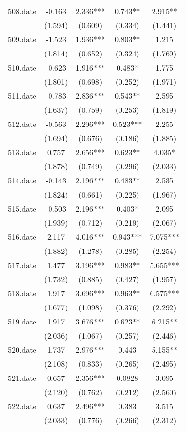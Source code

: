 \documentclass[]{article}
\begin{document}
\begin{tabular}{lcccc}
508.date & -0.163 & 2.336*** & 0.743** & 2.915** \\
 & (1.594) & (0.609) & (0.334) & (1.441) \\
509.date & -1.523 & 1.936*** & 0.803** & 1.215 \\
 & (1.814) & (0.652) & (0.324) & (1.769) \\
510.date & -0.623 & 1.916*** & 0.483* & 1.775 \\
 & (1.801) & (0.698) & (0.252) & (1.971) \\
511.date & -0.783 & 2.836*** & 0.543** & 2.595 \\
 & (1.637) & (0.759) & (0.253) & (1.819) \\
512.date & -0.563 & 2.296*** & 0.523*** & 2.255 \\
 & (1.694) & (0.676) & (0.186) & (1.885) \\
513.date & 0.757 & 2.656*** & 0.623** & 4.035* \\
 & (1.878) & (0.749) & (0.296) & (2.033) \\
514.date & -0.143 & 2.196*** & 0.483** & 2.535 \\
 & (1.824) & (0.661) & (0.225) & (1.967) \\
515.date & -0.503 & 2.196*** & 0.403* & 2.095 \\
 & (1.939) & (0.712) & (0.219) & (2.067) \\
516.date & 2.117 & 4.016*** & 0.943*** & 7.075*** \\
 & (1.882) & (1.278) & (0.285) & (2.254) \\
517.date & 1.477 & 3.196*** & 0.983** & 5.655*** \\
 & (1.732) & (0.885) & (0.427) & (1.957) \\
518.date & 1.917 & 3.696*** & 0.963** & 6.575*** \\
 & (1.677) & (1.098) & (0.376) & (2.292) \\
519.date & 1.917 & 3.676*** & 0.623** & 6.215** \\
 & (2.036) & (1.067) & (0.257) & (2.446) \\
520.date & 1.737 & 2.976*** & 0.443 & 5.155** \\
 & (2.108) & (0.833) & (0.265) & (2.495) \\
521.date & 0.657 & 2.356*** & 0.0828 & 3.095 \\
 & (2.120) & (0.762) & (0.212) & (2.560) \\
522.date & 0.637 & 2.496*** & 0.383 & 3.515 \\
 & (2.033) & (0.776) & (0.266) & (2.312) \\

\end{tabular}
\end{document}
